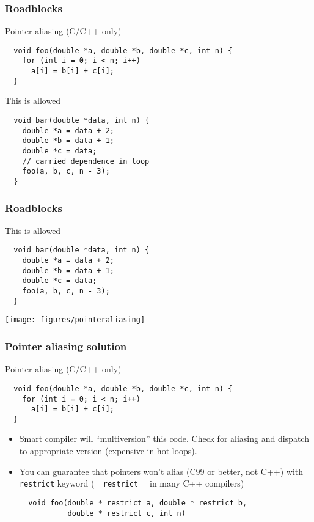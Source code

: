 \documentclass[presentation,aspectratio=43,10pt]{beamer}
\begin{document}
\begin{frame}[fragile]
  \frametitle{Roadblocks}
  \begin{challenge}{Pointer aliasing (C/C++ only)}
\begin{verbatim}
  void foo(double *a, double *b, double *c, int n) {
    for (int i = 0; i < n; i++)
      a[i] = b[i] + c[i];
  }
\end{verbatim}
  \end{challenge}
  \begin{exampleblock}{This is allowed}
\begin{verbatim}
  void bar(double *data, int n) {
    double *a = data + 2;
    double *b = data + 1;
    double *c = data;
    // carried dependence in loop
    foo(a, b, c, n - 3);
  }
\end{verbatim}
  \end{exampleblock}
\end{frame}
\begin{frame}[fragile]
  \frametitle{Roadblocks}
  \begin{exampleblock}{This is allowed}
\begin{verbatim}
  void bar(double *data, int n) {
    double *a = data + 2;
    double *b = data + 1;
    double *c = data;
    foo(a, b, c, n - 3);
  }
\end{verbatim}
  \end{exampleblock}
  \begin{center}
    \texttt{[image: figures/pointeraliasing]}
  \end{center}
\end{frame}

\begin{frame}[fragile]
  \frametitle{Pointer aliasing solution}
  \begin{challenge}{Pointer aliasing (C/C++ only)}
\begin{verbatim}
  void foo(double *a, double *b, double *c, int n) {
    for (int i = 0; i < n; i++)
      a[i] = b[i] + c[i];
  }
\end{verbatim}
  \end{challenge}
  \begin{itemize}
  \item Smart compiler will ``multiversion'' this code. Check for
    aliasing and dispatch to appropriate version (expensive in hot
    loops).
  \item You can guarantee that pointers won't alias (C99 or better,
    not C++) with \texttt{restrict} keyword (\texttt{\_\_restrict\_\_}
    in many C++ compilers)
\begin{verbatim}
  void foo(double * restrict a, double * restrict b,
           double * restrict c, int n)
\end{verbatim}
  \end{itemize}
\end{frame}
\end{document}
